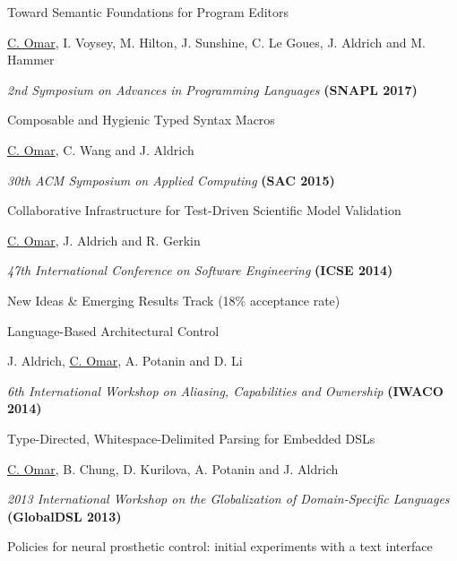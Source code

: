 \documentclass[10pt,letterpaper]{article}
\renewenvironment{itemize}{
  \begin{list}{}{
    \setlength{\leftmargin}{1.25em}
    \setlength{\itemsep}{0.25em}
    \setlength{\parskip}{0pt}
    \setlength{\parsep}{0.2em}
  }
}{
  \end{list}
}
\begin{document}
\begin{enumerate}[resume]
\item Toward Semantic Foundations for Program Editors
  \begin{itemize}
    \item \underline{C. Omar}, I. Voysey, M. Hilton, J. Sunshine, C. Le Goues, J. Aldrich and M. Hammer
    \item \textit{2nd Symposium on Advances in Programming Languages} {\textbf{(SNAPL 2017)}}
  \end{itemize}
\item Composable and Hygienic Typed Syntax Macros
  \begin{itemize}
    \item \underline{C. Omar}, C. Wang and J. Aldrich
    \item \textit{30th ACM Symposium on Applied Computing} {\textbf{(SAC 2015)}}
  \end{itemize}
\item Collaborative Infrastructure for Test-Driven Scientific Model Validation
  \begin{itemize}
    \item \underline{C. Omar}, J. Aldrich and R. Gerkin
    \item \textit{47th International Conference on Software Engineering} {\textbf{(ICSE 2014)}}
    \item New Ideas \& Emerging Results Track (18\% acceptance rate)
  \end{itemize}
\item Language-Based Architectural Control
  \begin{itemize}
    \item J. Aldrich, \underline{C. Omar}, A. Potanin and D. Li
    \item \textit{6th International Workshop on Aliasing, Capabilities and Ownership} {\textbf{(IWACO 2014)}}
  \end{itemize}
\item Type-Directed, Whitespace-Delimited Parsing for Embedded DSLs
  \begin{itemize}
    \item \underline{C. Omar}, B. Chung, D. Kurilova, A. Potanin and J. Aldrich
    \item \textit{2013 International Workshop on the Globalization of Domain-Specific Languages} {\textbf{(GlobalDSL 2013)}}
  \end{itemize}
\item Policies for neural prosthetic control: initial experiments with a text interface

\end{enumerate}
\end{document}
